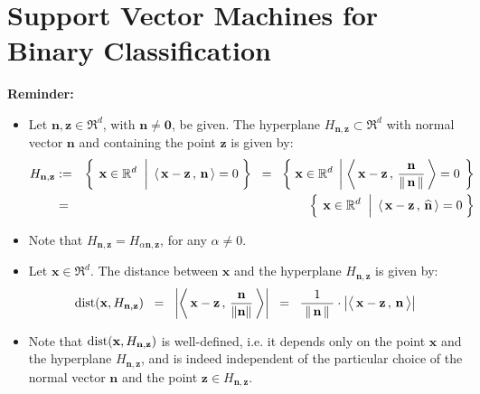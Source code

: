 
\section{Support Vector Machines for Binary Classification}
\setcounter{theorem}{0}

\vskip 0.3cm
\noindent
\textbf{Reminder:}
\begin{itemize}
\item  Let $\mathbf{n}, \mathbf{z} \in \Re^{d}$, with $\mathbf{n} \neq \mathbf{0}$, be given.
          The hyperplane $H_{\mathbf{n},\mathbf{z}} \subset \Re^{d}$ with normal vector $\mathbf{n}$ and
          containing the point $\mathbf{z}$ is given by: 
          \begin{eqnarray*}
          H_{\mathbf{n},\mathbf{z}}
          & := &
          \left\{\;
          	\left.
          	\mathbf{x}\overset{{\color{white}1}}{\in}\Re^{d}
		\;\;\right\vert\;
			\left\langle\,\mathbf{x}-\mathbf{z}\,,\,\mathbf{n}\,\right\rangle = 0
			\;\right\}
	\;\; = \;\;
	\left\{\;
		\mathbf{x}\in\Re^{d}
		\;\left\vert\;
			\left\langle\,\mathbf{x}-\mathbf{z}\,,\,\frac{\mathbf{n}}{\Vert\,\mathbf{n}\,\Vert}\,\right\rangle = 0
			\right.\;\right\}
	\\
	& = &
	\left\{\;
		\left.
		\mathbf{x}\overset{{\color{white}.}}{\in}\Re^{d}
		\;\;\right\vert\;
			\left\langle\,\mathbf{x}-\mathbf{z}\,,\,\widehat{\mathbf{n}}\,\right\rangle = 0
		\;\right\}
	\end{eqnarray*}
	
\item
	Note that $H_{\mathbf{n},\mathbf{z}} = H_{\alpha\mathbf{n},\mathbf{z}}$, for any $\alpha \neq 0$.
\item
	Let $\mathbf{x} \in \Re^{d}$.  The distance between $\mathbf{x}$ and the hyperplane $H_{\mathbf{n},\mathbf{z}}$
	is given by:
	\begin{equation*}
	\dist\!\left(\mathbf{x},H_{\mathbf{n},\mathbf{z}}\right)
	\;\; = \;\;
		\left\vert
		\left\langle\,\mathbf{x}-\mathbf{z}\,,\,\dfrac{\mathbf{n}}{\Vert\mathbf{n}\Vert}\,\right\rangle
		\right\vert
	\;\; = \;\;
		\dfrac{1}{{\color{white}.}\Vert\,\mathbf{n}\,\Vert{\color{white}.}}
		\cdot
		\left\vert
		\left\langle\,\mathbf{x}-\mathbf{z}\,,\,\overset{{\color{white}.}}{\mathbf{n}}\,\right\rangle
		\right\vert
	\end{equation*}
\item
	Note that
	$\textnormal{dist}\!\left(\mathbf{x},H_{\mathbf{n},\mathbf{z}}\right)$ is well-defined,
	i.e. it depends only on the point $\mathbf{x}$ and the hyperplane
	$H_{\mathbf{n},\mathbf{z}}$, and is indeed independent of the particular choice
	of the normal vector $\mathbf{n}$ and the point
	$\mathbf{z} \in H_{\mathbf{n},\mathbf{z}}$. 
\end{itemize}

